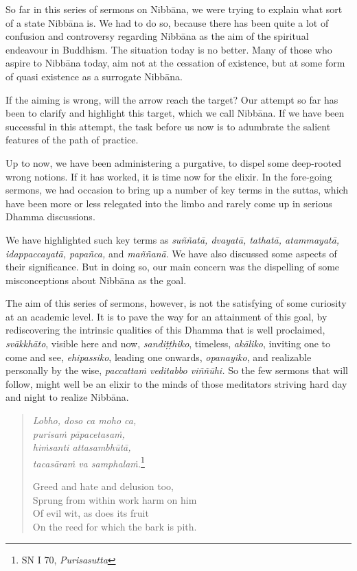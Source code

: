 So far in this series of sermons on Nibbāna, we were trying to explain what sort of a state Nibbāna is. We had to do so, because there has been quite a lot of confusion and controversy regarding Nibbāna as the aim of the spiritual endeavour in Buddhism. The situation today is no better. Many of those who aspire to Nibbāna today, aim not at the cessation of existence, but at some form of quasi existence as a surrogate Nibbāna.

If the aiming is wrong, will the arrow reach the target? Our attempt so far has been to clarify and highlight this target, which we call Nibbāna. If we have been successful in this attempt, the task before us now is to adumbrate the salient features of the path of practice.

Up to now, we have been administering a purgative, to dispel some deep-rooted wrong notions. If it has worked, it is time now for the elixir. In the fore-going sermons, we had occasion to bring up a number of key terms in the suttas, which have been more or less relegated into the limbo and rarely come up in serious Dhamma discussions.

We have highlighted such key terms as \emph{suññatā, dvayatā, tathatā, atammayatā, idappaccayatā, papañca,} and \emph{maññanā}. We have also discussed some aspects of their significance. But in doing so, our main concern was the dispelling of some misconceptions about Nibbāna as the goal.

The aim of this series of sermons, however, is not the satisfying of some curiosity at an academic level. It is to pave the way for an attainment of this goal, by rediscovering the intrinsic qualities of this Dhamma that is well proclaimed, \emph{svākkhāto}, visible here and now, \emph{sandiṭṭhiko}, timeless, \emph{akāliko}, inviting one to come and see, \emph{ehipassiko}, leading one onwards, \emph{opanayiko}, and realizable personally by the wise, \emph{paccattaṁ veditabbo viññūhi.} So the few sermons that will follow, might well be an elixir to the minds of those meditators striving hard day and night to realize Nibbāna.

\begin{quote}
\emph{Lobho, doso ca moho ca,}\\
\emph{purisaṁ pāpacetasaṁ,}\\
\emph{hiṁsanti attasambhūtā,}\\
\emph{tacasāraṁ va samphalaṁ.}\footnote{SN I 70, \emph{Purisasutta}}

Greed and hate and delusion too,\\
Sprung from within work harm on him\\
Of evil wit, as does its fruit\\
On the reed for which the bark is pith.
\end{quote}

